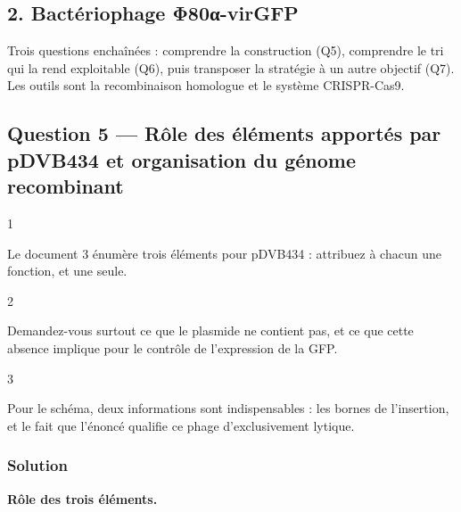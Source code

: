 \documentclass[11pt,a4paper]{article}
\begin{document}
\hypertarget{bactuxe9riophage-ux3c680ux3b1-virgfp}{%
\subsection{2. Bactériophage Φ80α-virGFP}\label{bactuxe9riophage-ux3c680ux3b1-virgfp}}

Trois questions enchaînées : comprendre la construction (Q5), comprendre le tri qui la rend exploitable (Q6), puis transposer la stratégie à un autre objectif (Q7). Les outils sont la recombinaison homologue et le système CRISPR-Cas9.

\hypertarget{question-5-ruxf4le-des-uxe9luxe9ments-apportuxe9s-par-pdvb434-et-organisation-du-guxe9nome-recombinant}{%
\subsection{Question 5 --- Rôle des éléments apportés par pDVB434 et organisation du génome recombinant}\label{question-5-ruxf4le-des-uxe9luxe9ments-apportuxe9s-par-pdvb434-et-organisation-du-guxe9nome-recombinant}}

\begin{indication}{1}

Le document 3 énumère trois éléments pour pDVB434 : attribuez à chacun une fonction, et une seule.

\end{indication}

\begin{indication}{2}

Demandez-vous surtout ce que le plasmide ne contient pas, et ce que cette absence implique pour le contrôle de l'expression de la GFP.

\end{indication}

\begin{indication}{3}

Pour le schéma, deux informations sont indispensables : les bornes de l'insertion, et le fait que l'énoncé qualifie ce phage d'exclusivement lytique.

\end{indication}

\hypertarget{solution-4}{%
\subsubsection{Solution}\label{solution-4}}

\textbf{Rôle des trois éléments.}
\end{document}
